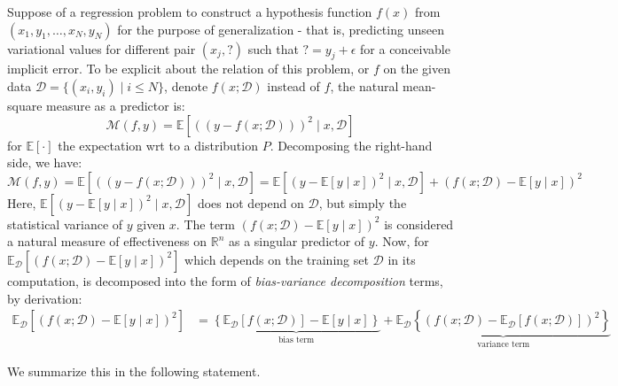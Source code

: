 Suppose of a regression problem to construct a hypothesis function $f(x)$ from $(x_{1},y_{1},\dots,x_{N},y_{N})$ for the purpose of generalization - that is, predicting unseen variational values for different pair $(x_{j}, \mathord{?})$ such that $\mathord{?}=y_{j}+\epsilon$ for a conceivable implicit error. To be explicit about the relation of this problem, or $f$ on the given data $\mathcal{D}=\{(x_i, y_i)\mid i \leq N\}$, denote $f(x;\mathcal{D})$ instead of $f$, the natural mean-square measure as a predictor is: 
\begin{equation}
    \mathcal{M}(f,y) = \mathbb{E} \left[((y-f(x;\mathcal{D})))^{2}\mid x, \mathcal{D}\right] 
\end{equation} for $\mathbb{E}[\cdot]$ the expectation wrt to a distribution $P$. Decomposing the right-hand side, we have: 
\begin{equation}
    \mathcal{M}(f,y) = \mathbb{E} \left[((y-f(x;\mathcal{D})))^{2}\mid x, \mathcal{D}\right] = \mathbb{E}\left[(y-\mathbb{E}[y\mid x])^{2}\mid x,\mathcal{D}\right] + (f(x;\mathcal{D})-\mathbb{E}[y\mid x])^{2}
\end{equation}
Here, $\mathbb{E}\left[(y-\mathbb{E}[y\mid x])^{2}\mid x,\mathcal{D}\right]$ does not depend on $\mathcal{D}$, but simply the statistical variance of $y$ given $x$. The term $(f(x;\mathcal{D})-\mathbb{E}[y\mid x])^{2}$ is considered a natural measure of effectiveness on $\mathbb{R}^{n}$ as a singular predictor of $y$. Now, for $\mathbb{E}_{\mathcal{D}}\left[(f(x;\mathcal{D})-\mathbb{E}[y\mid x])^{2}\right]$ which depends on the training set $\mathcal{D}$ in its computation, is decomposed into the form of \textit{bias-variance decomposition} terms, by derivation: 
\begin{equation}
    \begin{split}
        \mathbb{E}_{\mathcal{D}} \left[(f(x;\mathcal{D})-\mathbb{E}[y\mid x])^{2}\right] & = \underbrace{\left\{ \mathbb{E}_{\mathcal{D}}[f(x;\mathcal{D})] - \mathbb{E}[y\mid x] \right\}}_{\text{bias term}} + \underbrace{\mathbb{E}_{\mathcal{D}} \left\{(f(x;\mathcal{D})- \mathbb{E}_{\mathcal{D}}[f(x;\mathcal{D})])^{2}\right\}}_{\text{variance term}}
    \end{split}
\end{equation}

We summarize this in the following statement. 

